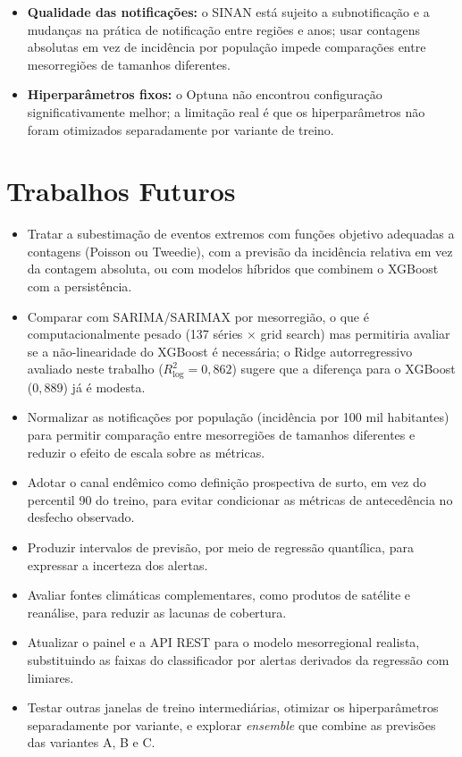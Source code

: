 \begin{itemize}
    \item \textbf{Qualidade das notificações:} o SINAN está sujeito a subnotificação e a mudanças na prática de notificação entre regiões e anos; usar contagens absolutas em vez de incidência por população impede comparações entre mesorregiões de tamanhos diferentes.
    \item \textbf{Hiperparâmetros fixos:} o Optuna não encontrou configuração significativamente melhor; a limitação real é que os hiperparâmetros não foram otimizados separadamente por variante de treino.
\end{itemize}

\section{Trabalhos Futuros}
\label{sec:trabalhos_futuros}

\begin{itemize}
    \item Tratar a subestimação de eventos extremos com funções objetivo adequadas a contagens (Poisson ou Tweedie), com a previsão da incidência relativa em vez da contagem absoluta, ou com modelos híbridos que combinem o XGBoost com a persistência.
    \item Comparar com SARIMA/SARIMAX por mesorregião, o que é computacionalmente pesado (137 séries $\times$ grid search) mas permitiria avaliar se a não-linearidade do XGBoost é necessária; o Ridge autorregressivo avaliado neste trabalho ($R^2_{\log}=0{,}862$) sugere que a diferença para o XGBoost ($0{,}889$) já é modesta.
    \item Normalizar as notificações por população (incidência por 100 mil habitantes) para permitir comparação entre mesorregiões de tamanhos diferentes e reduzir o efeito de escala sobre as métricas.
    \item Adotar o canal endêmico como definição prospectiva de surto, em vez do percentil 90 do treino, para evitar condicionar as métricas de antecedência no desfecho observado.
    \item Produzir intervalos de previsão, por meio de regressão quantílica, para expressar a incerteza dos alertas.
    \item Avaliar fontes climáticas complementares, como produtos de satélite e reanálise, para reduzir as lacunas de cobertura.
    \item Atualizar o painel e a API REST para o modelo mesorregional realista, substituindo as faixas do classificador por alertas derivados da regressão com limiares.
    \item Testar outras janelas de treino intermediárias, otimizar os hiperparâmetros separadamente por variante, e explorar \textit{ensemble} que combine as previsões das variantes A, B e C.
\end{itemize}
